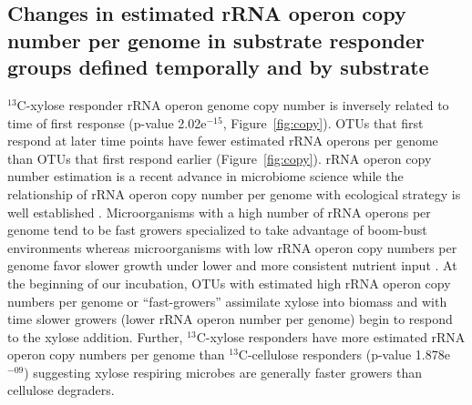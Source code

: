 \subsection{Changes in estimated rRNA operon copy number per genome in
substrate responder groups defined temporally and by substrate} $^{13}$C-xylose
responder rRNA operon genome copy number is inversely related to time of first
response (p-value 2.02e$^{-15}$, Figure~\ref{fig:copy}). OTUs that first
respond at later time points have fewer estimated rRNA operons per genome than
OTUs that first respond earlier (Figure~\ref{fig:copy}). rRNA operon copy
number estimation is a recent advance in microbiome science \citep{Kembel_2012}
while the relationship of rRNA operon copy number per genome with ecological
strategy is well established \citep{Klappenbach_2000}.  Microorganisms with a
high number of rRNA operons per genome tend to be fast growers specialized to
take advantage of boom-bust environments whereas microorganisms with low rRNA
operon copy numbers per genome favor slower growth under lower and more
consistent nutrient input \citep{Klappenbach_2000}. At the beginning of our
incubation, OTUs with estimated high rRNA operon copy numbers per genome or
``fast-growers'' assimilate xylose into biomass and with time slower growers
(lower rRNA operon number per genome) begin to respond to the xylose addition.
Further, $^{13}$C-xylose responders have more estimated rRNA operon copy
numbers per genome than $^{13}$C-cellulose responders (p-value 1.878e$^{-09}$)
suggesting xylose respiring microbes are generally faster growers than
cellulose degraders.
